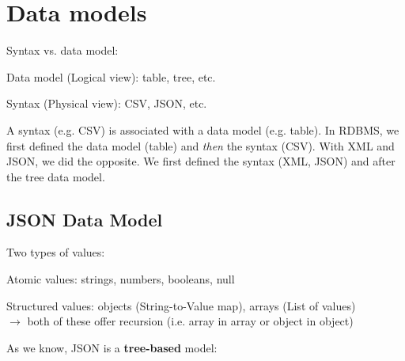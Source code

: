 \documentclass[11pt,oneside,a4paper]{article}
\begin{document}
\newpage

\section{Data models}

Syntax vs. data model:

\begin{compactitem}
	\item Data model (Logical view): table, tree, etc.
	\item Syntax (Physical view): CSV, JSON, etc.
\end{compactitem}

A syntax (e.g. CSV) is associated with a data model (e.g. table). In RDBMS, we first defined the data model (table) and \textit{then} the syntax (CSV). With XML and JSON, we did the opposite. We first defined the syntax (XML, JSON) and after the tree data model.

\subsection{JSON Data Model}

Two types of values:

\begin{compactitem}
	\item Atomic values: strings, numbers, booleans, null
	\item Structured values: objects (String-to-Value map), arrays (List of values)\\
	$\rightarrow$ both of these offer recursion (i.e. array in array or object in object)
\end{compactitem}

As we know, JSON is a \textbf{tree-based} model:
\end{document}
